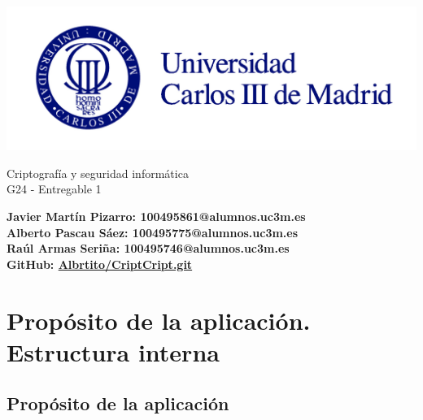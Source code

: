 \documentclass[a4paper,11pt]{article}
\begin{document}
\begin{titlepage}
    \begin{center}
        \vspace*{1cm} 
        \includegraphics[width=1\textwidth]{./images/uc3m.jpg}
        
        \vspace*{3cm} 
        
        {\LARGE Criptografía y seguridad informática\\[0.5cm]} 
        {\LARGE G24 - Entregable 1 \\[0.5cm]}
        
        \vspace*{6cm}
        
        \textbf{Javier Martín Pizarro: 100495861@alumnos.uc3m.es} \\[0.5cm]
        \textbf{Alberto Pascau Sáez: 100495775@alumnos.uc3m.es} \\[0.5cm]
        \textbf{Raúl Armas Seriña: 100495746@alumnos.uc3m.es} \\[0.5cm]
        
        \vspace*{3cm}
        \textbf{GitHub:
        \href{https://github.com/Albrtito/CriptCript.git}{Albrtito/CriptCript.git}}\\[0.5cm]

    \end{center}
\end{titlepage}

\tableofcontents
\vspace{2cm}


\section{Propósito de la aplicación. Estructura interna}

\subsection{Propósito de la aplicación}
\end{document}
